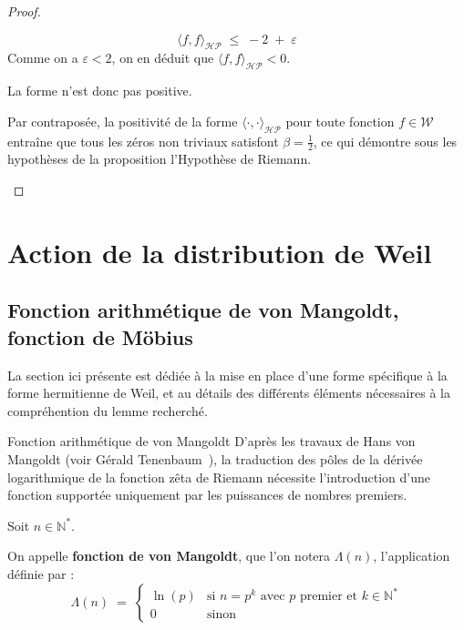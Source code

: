 \documentclass[Riemann_Hypothesis.tex]{subfiles}
\begin{document}
\begin{proof}
\begin{part_proof}
\begin{equation*}
            \langle f, f \rangle_{\mathcal{HP}} \;\leq\; -2 \;+\; \varepsilon
        \end{equation*}
        Comme on a $\varepsilon < 2$, on en déduit que $\langle f, f \rangle_{\mathcal{HP}} < 0$. \par
        La forme n'est donc pas positive. \par
        Par contraposée, la positivité de la forme
        $\langle \cdot, \cdot \rangle_{\mathcal{HP}}$ pour toute fonction
        $f \in \mathcal{W}$ entraîne que tous les zéros non triviaux
        satisfont $\beta = \frac{1}{2}$, ce qui démontre sous les hypothèses de la proposition
        l'Hypothèse de Riemann.
    \end{part_proof}
\end{proof}

\color{red}
\section{Action de la distribution de Weil}
\color{black}

\color{red}
\subsection{Fonction arithmétique de von Mangoldt, fonction de Möbius}
\color{black}

La section ici présente est dédiée à la mise en place d'une forme spécifique
à la forme hermitienne de Weil, et au détails des différents éléments nécessaires
à la compréhention du lemme recherché.

\begin{DefNef}[label=df:VonMangoldt_fr]{Fonction arithmétique de von Mangoldt}
    D'après les travaux de Hans von Mangoldt (voir Gérald Tenenbaum~\cite{von-Manglot_tenenbaum2015_intro}), 
    la traduction des pôles de la dérivée logarithmique de la fonction zêta de 
    Riemann nécessite l'introduction d'une fonction supportée uniquement par les 
    puissances de nombres premiers. \par
    Soit $n \in \mathbb{N}^*$. \par
    On appelle \textbf{fonction de von Mangoldt}, que l'on notera $\Lambda(n)$, l'application définie par :
    \begin{equation*}
        \Lambda(n) \;=\;
        \begin{cases}
            \ln(p) & \text{si } n = p^k \text{ avec } p \text{ premier et } k \in \mathbb{N}^* \\
            0 & \text{sinon}
        \end{cases}
    \end{equation*}
\end{DefNef}
\end{document}
